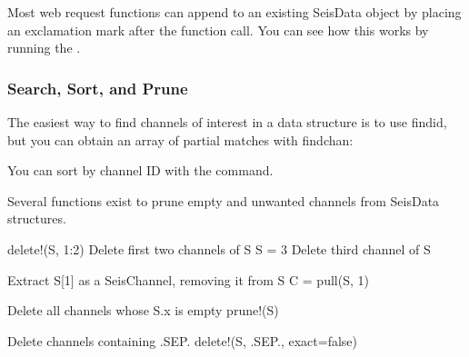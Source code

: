 \documentclass[letterpaper,11pt,english]{sphinxmanual}
\begin{document}
Most web request functions can append to an existing SeisData object by placing
an exclamation mark after the function call. You can see how this works by
running the .


\subsubsection{Search, Sort, and Prune}
\label{\detokenize{src/working_with_data:search-sort-and-prune}}
The easiest way to find channels of interest in a data structure is to
use findid, but you can obtain an array of partial matches with findchan:

%
\begin{sphinxVerbatim}[commandchars=\\\{\}]
   
       
      \PYG{p}{[}    \PYG{p}{]} 
     
           
\end{sphinxVerbatim}

You can sort by channel ID with the  command.

Several functions exist to prune empty and unwanted channels from SeisData
structures.

%
\begin{sphinxVerbatim}[commandchars=\\\{\}]
delete!(S, 1:2)  \PYGZsh{} Delete first two channels of S
S \PYGZhy{}= 3           \PYGZsh{} Delete third channel of S

\PYGZsh{} Extract S[1] as a SeisChannel, removing it from S
C = pull(S, 1)

\PYGZsh{} Delete all channels whose S.x is empty
prune!(S)

\PYGZsh{} Delete channels containing \PYGZdq{}.SEP.\PYGZdq{}
delete!(S, \PYGZdq{}.SEP.\PYGZdq{}, exact=false)
\end{sphinxVerbatim}
\end{document}
